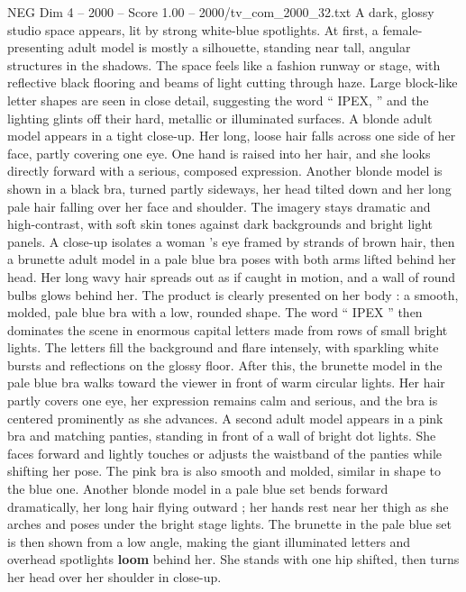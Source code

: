 \begin{textsample}{NEG Dim 4 – 2000 – Score 1.00 – 2000/tv\_com\_2000\_32.txt}  \label{ex:f4_neg_049}
A dark, glossy studio space appears, lit by strong white-blue spotlights.
At first, a female-presenting adult model is mostly a silhouette, standing near tall, angular structures in the shadows.
The space feels like a fashion runway or stage, with reflective black flooring and beams of light cutting through haze.
Large block-like letter shapes are seen in close detail, suggesting the word “ IPEX, ” and the lighting glints off their hard, metallic or illuminated surfaces.
A blonde adult model appears in a tight close-up.
Her long, loose hair falls across one side of her face, partly covering one eye.
One hand is raised into her hair, and she looks directly forward with a serious, composed expression.
Another blonde model is shown in a black bra, turned partly sideways, her head tilted down and her long pale hair falling over her face and shoulder.
The imagery stays dramatic and high-contrast, with soft skin tones against dark backgrounds and bright light panels.
A close-up isolates a woman ’s eye framed by strands of brown hair, then a brunette adult model in a pale blue bra poses with both arms lifted behind her head.
Her long wavy hair spreads out as if caught in motion, and a wall of round bulbs glows behind her.
The product is clearly presented on her body : a smooth, molded, pale blue bra with a low, rounded shape.
The word “ IPEX ” then dominates the scene in enormous capital letters made from rows of small bright lights.
The letters fill the background and flare intensely, with sparkling white bursts and reflections on the glossy floor.
After this, the brunette model in the pale blue bra walks toward the viewer in front of warm circular lights.
Her hair partly covers one eye, her expression remains calm and serious, and the bra is centered prominently as she advances.
A second adult model appears in a pink bra and matching panties, standing in front of a wall of bright dot lights.
She faces forward and lightly touches or adjusts the waistband of the panties while shifting her pose.
The pink bra is also smooth and molded, similar in shape to the blue one.
Another blonde model in a pale blue set bends forward dramatically, her long hair flying outward ; her hands rest near her thigh as she arches and poses under the bright stage lights.
The brunette in the pale blue set is then shown from a low angle, making the giant illuminated letters and overhead spotlights \textbf{loom} behind her.
She stands with one hip shifted, then turns her head over her shoulder in close-up.

\end{textsample}
